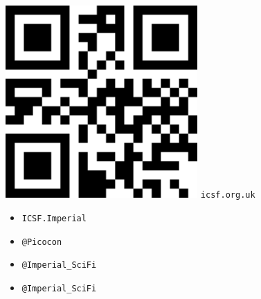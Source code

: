 \newenvironment{smlist}{\begin{itemize}\itemsep-0.6em}{\end{itemize}}
\newcommand{\socialmedia}[2]{
\item[\raisebox{\dimexpr-.55em}{
    \texttt{[image: img/media/\#1]}
}] {\texttt{#2}}
}
\begin{center}
\begin{minipage}{0.25\textwidth}
  \begin{center}
    \includegraphics[width=0.55\textwidth]{img/media/qr-small}
    \vfill
  \texttt{icsf.org.uk}
  \end{center}
\end{minipage}%
\begin{minipage}{0.3\textwidth}
  \begin{smlist}
  \socialmedia{facebook}{ICSF.Imperial}
  \socialmedia{twitter}{@Picocon}
  \socialmedia{twitter}{@Imperial\_SciFi}
  \socialmedia{instagram}{@Imperial\_SciFi}
  \end{smlist}
\end{minipage}
\end{center}

